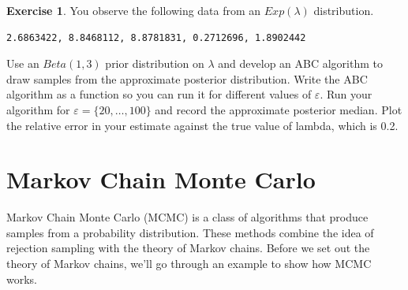 \documentclass[
]{book}
\theoremstyle{definition}
\theoremstyle{definition}
\theoremstyle{definition}
\newtheorem{exercise}{Exercise}[chapter]
\theoremstyle{definition}
\theoremstyle{remark}
\begin{document}
\begin{exercise}
You observe the following data from an \(Exp(\lambda)\) distribution.

\begin{verbatim}
2.6863422, 8.8468112, 8.8781831, 0.2712696, 1.8902442
\end{verbatim}

Use an \(Beta(1, 3)\) prior distribution on \(\lambda\) and develop an ABC algorithm to draw samples from the approximate posterior distribution. Write the ABC algorithm as a function so you can run it for different values of \(\varepsilon\). Run your algorithm for \(\varepsilon = \{20, \ldots, 100\}\) and record the approximate posterior median. Plot the relative error in your estimate against the true value of lambda, which is 0.2.
\end{exercise}

\chapter{Markov Chain Monte Carlo}\label{markov-chain-monte-carlo}

Markov Chain Monte Carlo (MCMC) is a class of algorithms that produce samples from a probability distribution. These methods combine the idea of rejection sampling with the theory of Markov chains. Before we set out the theory of Markov chains, we'll go through an example to show how MCMC works.
\end{document}
